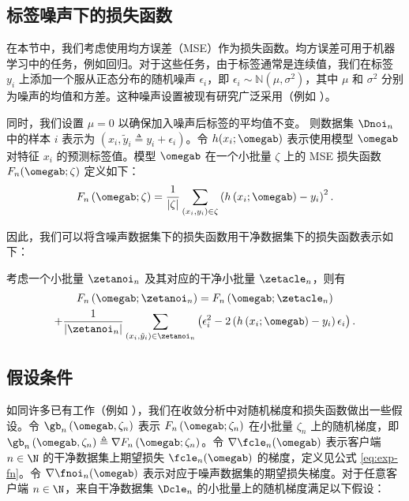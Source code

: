 \subsection{标签噪声下的损失函数}
在本节中，我们考虑使用均方误差（MSE）作为损失函数。均方误差可用于机器学习中的任务，例如回归。对于这些任务，由于标签通常是连续值，我们在标签 $y_i$ 上添加一个服从正态分布的随机噪声 $\epsilon_i$，即 $\epsilon_i \sim \mathbb{N}(\mu, \sigma^2)$，其中 $\mu$ 和 $\sigma^2$ 分别为噪声的均值和方差。这种噪声设置被现有研究广泛采用（例如 \cite{frenay2013classification}）。

同时，我们设置 $\mu=0$ 以确保加入噪声后标签的平均值不变。  
则数据集 $\Dnoi_n$ 中的样本 $i$ 表示为 $(x_i,\tilde{y}_i \triangleq y_i+\epsilon_i)$。令 $h(x_i;\omegab)$ 表示使用模型 $\omegab$ 对特征 $x_i$ 的预测标签值。模型 $\omegab$ 在一个小批量 $\zeta$ 上的 MSE 损失函数 $F_{n}(\omegab;\zeta)$ 定义如下：
\begin{equation}\label{eq:mse}
F_n\left(\omegab;\zeta\right)=\frac{1}{|\zeta|}\sum_{\left(x_i,{y}_i\right)\in \zeta}\left(h\left(x_i;\omegab\right)-{y}_i\right)^2.
\end{equation}

因此，我们可以将含噪声数据集下的损失函数用干净数据集下的损失函数表示如下：

\begin{lemma}[带标签噪声的均方误差]\label{lem:mse}
考虑一个小批量 $\zetanoi_n$ 及其对应的干净小批量 $\zetacle_n$，则有
\begin{multline}
F_n\left(\omegab;\zetanoi_n\right)=F_n\left(\omegab;\zetacle_n\right)\\
    +\frac{1}{|\zetanoi_n|}\sum_{\left(x_i,\tilde{y}_i\right)\in \zetanoi_n}\left( \epsilon_i^2 - 2\left(h\left(x_i;\omegab\right)-y_i\right)\epsilon_i \right).
\end{multline}
\end{lemma}

\subsection{假设条件}
如同许多已有工作（例如 \cite{b4,b11,b8}），我们在收敛分析中对随机梯度和损失函数做出一些假设。令 $\gb_n\left(\omegab,\zeta_n\right)$ 表示 $F_n\left(\omegab;\zeta_n\right)$ 在小批量 $\zeta_n$ 上的随机梯度，即 $\gb_n\left(\omegab,\zeta_n\right)\triangleq \nabla F_n\left(\omegab;\zeta_n\right)$。令 $\nabla \fcle_n(\omegab)$ 表示客户端 $n\in\N$ 的干净数据集上期望损失 $\fcle_n(\omegab)$ 的梯度，定义见公式 \eqref{eq:exp-fn}。令 $\nabla \fnoi_n(\omegab)$ 表示对应于噪声数据集的期望损失梯度。对于任意客户端 $n\in\N$，来自干净数据集 $\Dcle_n$ 的小批量上的随机梯度满足以下假设：

